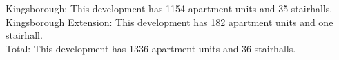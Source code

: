 {Kingsborough}: This development has 1154 apartment units and 35 stairhalls.\\{Kingsborough Extension}: This development has 182 apartment units and one stairhall.\\{Total}: This development has 1336 apartment units and 36 stairhalls.\\